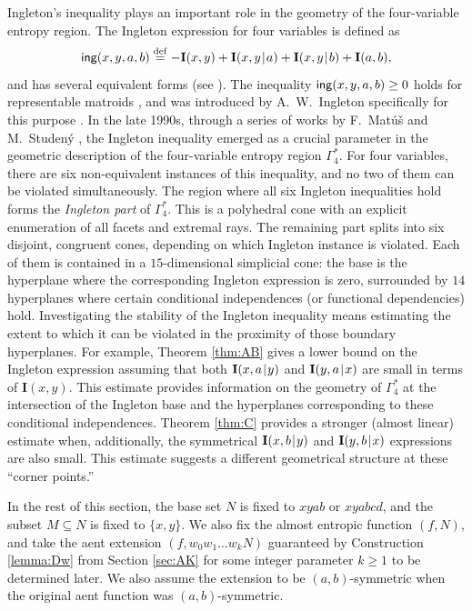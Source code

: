 \documentclass[a4paper]{IEEEtran}
\def\|{\mskip1.5mu{|}\mskip1.5mu}
\def\I{\mathbf I}
\def\Ga#1{\Gamma^*_{\!#1}}
\newcommand\eqdef{\stackrel{\mathrm{def}}{=}}
\def\ing[#1,#2,#3,#4]{\mathsf{ing}(#1,#2,#3,#4\mkern 0mu)}
\theoremstyle{definition}
\begin{document}
Ingleton's inequality plays an important role in the geometry of the
four-variable entropy region. The Ingleton expression for four variables is
defined as
$$
   \ing[x,y,a,b] \eqdef -\I(x,y)+\I(x,y\|a)+\I(x,y\|b)+\I(a,b),
$$
and has several equivalent forms (see \cite{studeny21}). The inequality
$\ing[x,y,a,b]\ge 0$ holds for representable matroids \cite{oxley}, and was
introduced by A.~W.~Ingleton specifically for this purpose \cite{ingleton}. In
the late 1990s, through a series of works by F.~Mat\'u\v{s} and M.~Studen\'y
\cite{Ma.Stud, mat95, mat99}, the Ingleton inequality emerged as a crucial
parameter in the geometric description of the four-variable entropy region
$\Ga4$. For four variables, there are six non-equivalent instances of this
inequality, and no two of them can be violated simultaneously. The region
where all six Ingleton inequalities hold forms the \emph{Ingleton part} of
$\Ga4$. This is a polyhedral cone with an explicit enumeration of all facets
and extremal rays. The remaining part splits into six disjoint, congruent
cones, depending on which Ingleton instance is violated. Each of them is
contained in a $15$-dimensional simplicial cone: the base is the hyperplane
where the corresponding Ingleton expression is zero, surrounded by $14$
hyperplanes where certain conditional independences (or functional
dependencies) hold. Investigating the stability of the Ingleton inequality
means estimating the extent to which it can be violated in the proximity of
those boundary hyperplanes. For example, Theorem \ref{thm:AB} gives a lower
bound on the Ingleton expression assuming that both $\I(x,a\|y)$ and
$\I(y,a\|x)$ are small in terms of $\I(x,y)$. This estimate provides
information on the geometry of $\Ga4$ at the intersection of the Ingleton
base and the hyperplanes corresponding to these conditional independences.
Theorem \ref{thm:C} provides a stronger (almost linear) estimate when,
additionally, the symmetrical $\I(x,b\|y)$ and $\I(y,b\|x)$ expressions are
also small. This estimate suggests a different geometrical structure at these
``corner points.''

In the rest of this section, the base set $N$ is fixed to $xyab$ or
$xyabcd$, and the subset $M\subseteq N$ is fixed to $\{x,y\}$. We also fix the
almost entropic function $(f,N)$, and take the aent extension
$(f,w_0w_1\dots w_kN)$ guaranteed by Construction \ref{lemma:Dw} from
Section \ref{sec:AK} for some integer parameter $k\ge 1$ to be determined
later. We also assume the extension to be $(a,b)$-symmetric when the
original aent function was $(a,b)$-symmetric.
\end{document}
